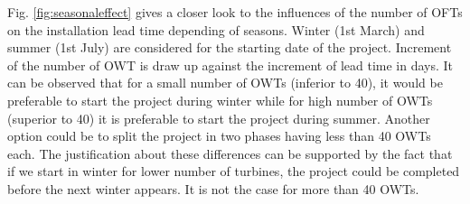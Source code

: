 Fig. \ref{fig:seasonaleffect} gives a closer look to the influences of the number of OFTs on the installation lead time depending of seasons. Winter (1st March) and summer (1st July) are considered for the starting date of the project. Increment of the number of OWT is draw up against the increment of lead time in days. It can be observed that for a small number of OWTs (inferior to 40), it would be preferable to start the project during winter while for high number of OWTs (superior to 40) it is preferable to start the project during summer. Another option could be to split the project in two phases having less than 40 OWTs each. The justification about these differences can be supported by the fact that if we start in winter for lower number of turbines, the project could be completed before the next winter appears. It is not the case for more than 40 OWTs.